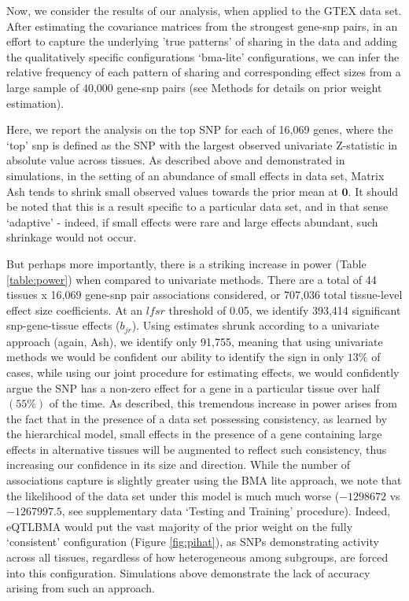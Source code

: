 Now, we consider the results of our analysis, when applied to the GTEX data set. After estimating the covariance matrices from the strongest gene-snp pairs, in an effort to capture the underlying 'true patterns' of sharing in the data and adding the qualitatively specific configurations `bma-lite' configurations, we can infer the relative frequency of each pattern of sharing and corresponding effect sizes from a large sample of 40,000 gene-snp pairs (see Methods for details on prior weight estimation).

Here, we report the analysis on the top SNP for each of 16,069 genes, where the `top' snp is defined as the SNP with the largest observed univariate Z-statistic in absolute value across tissues. As described above and demonstrated in simulations, in the setting of an abundance of small effects in data set, Matrix Ash tends to shrink small observed values towards the prior mean at $\bm{0}$. It should be noted that this is a result specific to a particular data set, and in that sense `adaptive' - indeed, if small effects were rare and large effects abundant, such shrinkage would not occur. 

But perhaps more importantly, there is a striking increase in power (Table \ref{table:power}) when compared to univariate methods. There are a total of 44 tissues x 16,069 gene-snp pair associations considered, or 707,036 total tissue-level effect size coefficients. At an $lfsr$ threshold of 0.05, we identify 393,414 significant snp-gene-tissue effects ($b_{jr}$). Using estimates shrunk according to a univariate approach (again, Ash),  we identify only 91,755, meaning that using univariate methods we would be confident our ability to identify the sign in only $13\%$ of cases, while using our joint procedure for estimating effects, we would confidently argue the SNP has a non-zero effect for a gene in a particular tissue over half $(55\%)$ of the time. As described, this tremendous increase in power arises from the fact that in the presence of  a data set possessing consistency, as learned by the hierarchical model, small effects in the presence of a gene containing large effects in alternative tissues will be augmented to reflect such consistency, thus increasing our confidence in its size and direction. While the number of associations capture is slightly greater using the BMA lite approach, we note that the likelihood of the data set under this model is much much worse ($-1298672$ vs $-1267997.5$, see supplementary data `Testing and Training' procedure). Indeed, eQTLBMA would put the vast majority of the prior weight on the fully `consistent' configuration (Figure \ref{fig:pihat}), as SNPs demonstrating activity across all tissues, regardless of how heterogeneous among subgroups, are forced into this configuration. Simulations above demonstrate the lack of accuracy arising from such an approach. %


